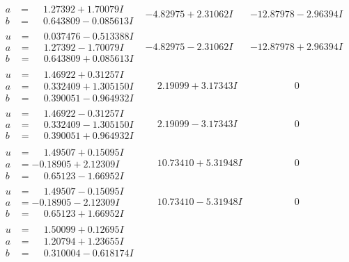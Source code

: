 \documentclass[1p]{elsarticle_modified}
\theoremstyle{definition}
\begin{document}
$$\begin{array}{c|c|c}
\begin{aligned}
a &= \phantom{-}1.27392 + 1.70079 I \\
b &= \phantom{-}0.643809 - 0.085613 I\end{aligned}
 & -4.82975 + 2.31062 I & -12.87978 - 2.96394 I \\ \hline\begin{aligned}
u &= \phantom{-}0.037476 - 0.513388 I \\
a &= \phantom{-}1.27392 - 1.70079 I \\
b &= \phantom{-}0.643809 + 0.085613 I\end{aligned}
 & -4.82975 - 2.31062 I & -12.87978 + 2.96394 I \\ \hline\begin{aligned}
u &= \phantom{-}1.46922 + 0.31257 I \\
a &= \phantom{-}0.332409 + 1.305150 I \\
b &= \phantom{-}0.390051 - 0.964932 I\end{aligned}
 & \phantom{-}2.19099 + 3.17343 I & \phantom{-0.000000 } 0 \\ \hline\begin{aligned}
u &= \phantom{-}1.46922 - 0.31257 I \\
a &= \phantom{-}0.332409 - 1.305150 I \\
b &= \phantom{-}0.390051 + 0.964932 I\end{aligned}
 & \phantom{-}2.19099 - 3.17343 I & \phantom{-0.000000 } 0 \\ \hline\begin{aligned}
u &= \phantom{-}1.49507 + 0.15095 I \\
a &= -0.18905 + 2.12309 I \\
b &= \phantom{-}0.65123 - 1.66952 I\end{aligned}
 & \phantom{-}10.73410 + 5.31948 I & \phantom{-0.000000 } 0 \\ \hline\begin{aligned}
u &= \phantom{-}1.49507 - 0.15095 I \\
a &= -0.18905 - 2.12309 I \\
b &= \phantom{-}0.65123 + 1.66952 I\end{aligned}
 & \phantom{-}10.73410 - 5.31948 I & \phantom{-0.000000 } 0 \\ \hline\begin{aligned}
u &= \phantom{-}1.50099 + 0.12695 I \\
a &= \phantom{-}1.20794 + 1.23655 I \\
b &= \phantom{-}0.310004 - 0.618174 I\end{aligned}

\end{array}$$
\end{document}
